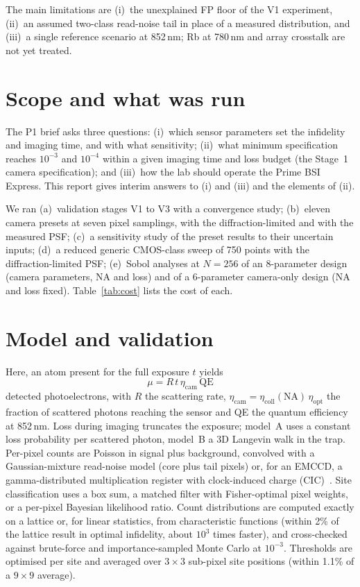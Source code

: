\documentclass[11pt,a4paper]{article}
\begin{document}
The main limitations are (i)~the unexplained FP floor of the V1 experiment, (ii)~an assumed two-class
read-noise tail in place of a measured distribution, and (iii)~a single reference scenario at 852\,nm;
Rb at 780\,nm and array crosstalk are not yet treated.

\section{Scope and what was run}

The P1 brief asks three questions: (i)~which sensor parameters set the infidelity and imaging time,
and with what sensitivity; (ii)~what minimum specification reaches $10^{-3}$ and $10^{-4}$ within a
given imaging time and loss budget (the Stage~1 camera specification); and (iii)~how the lab should
operate the Prime BSI Express. This report gives interim answers to (i) and (iii) and the elements
of (ii).

We ran (a)~validation stages V1 to V3 with a convergence study; (b)~eleven camera presets at seven
pixel samplings, with the diffraction-limited and with the measured PSF; (c)~a sensitivity study of
the preset results to their uncertain inputs; (d)~a reduced generic CMOS-class sweep of 750 points
with the diffraction-limited PSF; (e)~Sobol analyses at $N = 256$ of an 8-parameter design (camera
parameters, NA and loss) and of a 6-parameter camera-only design (NA and loss fixed).
Table~\ref{tab:cost} lists the cost of each.

\section{Model and validation}

Here, an atom present for the full exposure $t$ yields
\begin{equation}
  \mu = R\, t\, \eta_\mathrm{cam}\, \mathrm{QE}
\end{equation}
detected photoelectrons, with $R$ the scattering rate,
$\eta_\mathrm{cam} = \eta_\mathrm{coll}(\mathrm{NA})\,\eta_\mathrm{opt}$ the fraction of scattered
photons reaching the sensor and QE the quantum efficiency at 852\,nm. Loss during imaging truncates
the exposure; model~A uses a constant loss probability per scattered photon, model~B a 3D Langevin
walk in the trap. Per-pixel counts are Poisson in signal plus background, convolved with a
Gaussian-mixture read-noise model (core plus tail pixels) or, for an EMCCD, a gamma-distributed
multiplication register with clock-induced charge (CIC)~\cite{basden}. Site classification uses a box
sum, a matched filter with Fisher-optimal pixel weights, or a per-pixel Bayesian likelihood ratio.
Count distributions are computed exactly on a lattice or, for linear statistics, from characteristic
functions (within 2\% of the lattice result in optimal infidelity, about $10^3$ times faster), and
cross-checked against brute-force and importance-sampled Monte Carlo at $10^{-3}$. Thresholds are
optimised per site and averaged over $3\times3$ sub-pixel site positions (within 1.1\% of a $9\times9$
average).
\end{document}
